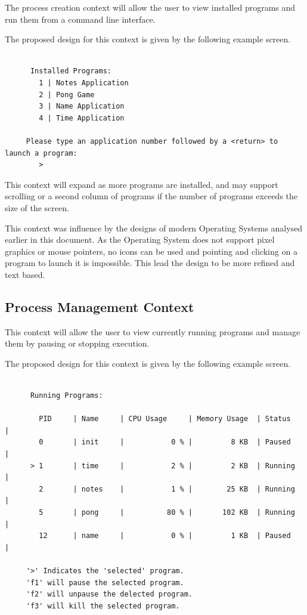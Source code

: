 \documentclass[a4paper]{report}
\begin{document}
The process creation context will allow the user to view installed programs and run them from a command line interface.

The proposed design for this context is given by the following example screen.
{\ttfamily \small
  \begin{framed}
    \begin{verbatim}

      Installed Programs:
        1 | Notes Application
        2 | Pong Game
        3 | Name Application
        4 | Time Application

     Please type an application number followed by a <return> to launch a program:
        >

    \end{verbatim}
  \end{framed}
}


This context will expand as more programs are installed, and may support scrolling or a second column of programs if the number of programs exceeds the size of the screen.

This context was influence by the designs of modern Operating Systems analysed earlier in this document. As the Operating System does not support pixel graphics or mouse pointers, no icons can be used and pointing and clicking on a program to launch it is impossible. This lead the design to be more refined and text based.


\subsection{Process Management Context}

This context will allow the user to view currently running programs and manage them by pausing or stopping execution.

The proposed design for this context is given by the following example screen.

{\ttfamily \small
  \begin{framed}
    \begin{verbatim}

      Running Programs:

        PID     | Name     | CPU Usage     | Memory Usage  | Status     |
        0       | init     |           0 % |         8 KB  | Paused     |
      > 1       | time     |           2 % |         2 KB  | Running    |
        2       | notes    |           1 % |        25 KB  | Running    |
        5       | pong     |          80 % |       102 KB  | Running    |
        12      | name     |           0 % |         1 KB  | Paused     |

     '>' Indicates the 'selected' program.
     'f1' will pause the selected program.
     'f2' will unpause the delected program.
     'f3' will kill the selected program.

    \end{verbatim}
  \end{framed}
}
\end{document}
